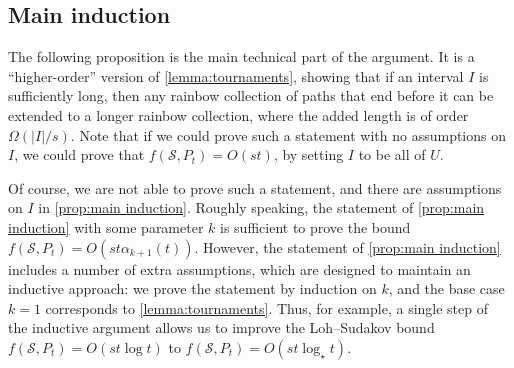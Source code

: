 \documentclass[a4paper,11pt]{article}
\theoremstyle{definition}
\def\cS{\mathcal{S}}
\newcommand{\ab}[1]{\lvert #1 \rvert}
\begin{document}
\subsection{Main induction}

The following proposition is the main technical part of the argument. It is a ``higher-order'' version of \cref{lemma:tournaments}, showing that if an interval $I$ is sufficiently long, then any rainbow collection of paths that end before it can be extended to a longer rainbow collection, where the added length is of order $\Omega(\ab I/s)$. Note that if we could prove such a statement with no assumptions on $I$, we could prove that $f(\cS, P_t)=O(st)$, by setting $I$ to be all of $U$. 

Of course, we are not able to prove such a statement, and there are assumptions on $I$ in \cref{prop:main induction}. Roughly speaking, the statement of \cref{prop:main induction} with some parameter $k$ is sufficient to prove the bound $f(\cS, P_t) = O(st \alpha_{k+1}(t))$. However, the statement of \cref{prop:main induction} includes a number of extra assumptions, which are designed to maintain an inductive approach: we prove the statement by induction on $k$, and the base case $k=1$ corresponds to \cref{lemma:tournaments}. Thus, for example, a single step of the inductive argument allows us to improve the Loh--Sudakov bound $f(\cS, P_t) = O(st\log t)$ to $f(\cS, P_t) = O(st \log_\star t)$. 
\end{document}
